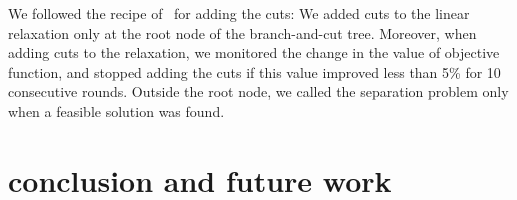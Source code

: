 \documentclass[conference,compsoc]{IEEEtran}
\begin{document}
We followed the recipe of~\cite{CarvajalCGVW13} for adding the cuts: We added cuts to the
linear relaxation only at the root node of the branch-and-cut tree.
Moreover, when adding cuts to the relaxation, we monitored the change in
the value of objective function, and stopped adding the cuts if this
value improved less than 5\% for 10 consecutive rounds. Outside the root
node, we called the separation problem only when a feasible solution was
found.

\section{conclusion and future work}
\label{sec:conclusion}



\end{document}
